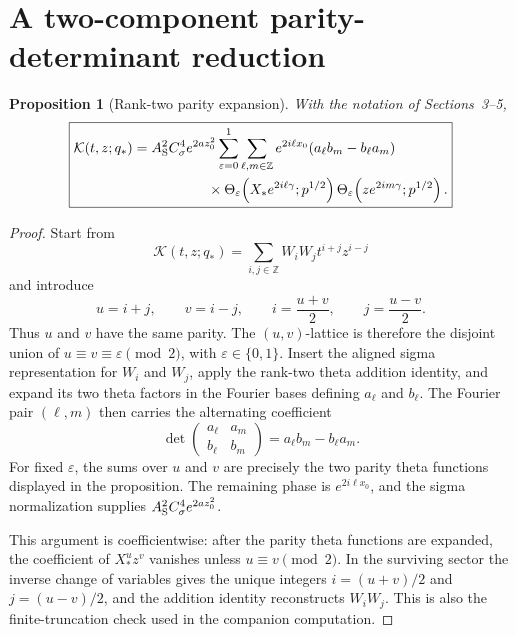 \documentclass[11pt]{article}
\newtheorem{proposition}{Proposition}[section]
\numberwithin{equation}{section}
\begin{document}
\section{A two-component parity-determinant reduction}

\begin{proposition}[Rank-two parity expansion]
With the notation of Sections~3--5,
\begin{equation}
\boxed{
\begin{aligned}
\mathcal K(t,z;q_\ast)
={}&A_{\rm S}^2C_\sigma^4e^{2az_0^2}
\sum_{\varepsilon=0}^1\sum_{\ell,m\in\mathbb Z}
 e^{2i\ell x_0}(a_\ell b_m-b_\ell a_m)\\
&\qquad\qquad\times
\Theta_\varepsilon\!\left(X_\ast e^{2i\ell\gamma};p^{1/2}\right)
\Theta_\varepsilon\!\left(ze^{2im\gamma};p^{1/2}\right).
\end{aligned}}
\end{equation}
\end{proposition}
\begin{proof}
Start from
\begin{equation}
\mathcal K(t,z;q_\ast)=\sum_{i,j\in\mathbb Z}W_iW_jt^{i+j}z^{i-j}
\end{equation}
and introduce
\begin{equation}
u=i+j,\qquad v=i-j,\qquad i=\frac{u+v}{2},\qquad j=\frac{u-v}{2}.
\end{equation}
Thus $u$ and $v$ have the same parity.  The $(u,v)$-lattice is therefore the
disjoint union of $u\equiv v\equiv\varepsilon\pmod2$, with
$\varepsilon\in\{0,1\}$.  Insert the aligned sigma representation for
$W_i$ and $W_j$, apply the rank-two theta addition identity, and expand its
two theta factors in the Fourier bases defining $a_\ell$ and $b_\ell$.
The Fourier pair $(\ell,m)$ then carries the alternating coefficient
\begin{equation}
\det\!\begin{pmatrix}a_\ell&a_m\\ b_\ell&b_m\end{pmatrix}
=a_\ell b_m-b_\ell a_m.
\end{equation}
For fixed $\varepsilon$, the sums over $u$ and $v$ are precisely the two
parity theta functions displayed in the proposition.  The remaining phase is
$e^{2i\ell x_0}$, and the sigma normalization supplies
$A_{\rm S}^2C_\sigma^4e^{2az_0^2}$.

This argument is coefficientwise: after the parity theta functions are
expanded, the coefficient of $X_\ast^u z^v$ vanishes unless
$u\equiv v\pmod2$.  In the surviving sector the inverse change of variables
gives the unique integers $i=(u+v)/2$ and $j=(u-v)/2$, and the addition
identity reconstructs $W_iW_j$.  This is also the finite-truncation check used
in the companion computation.
\end{proof}
\end{document}
